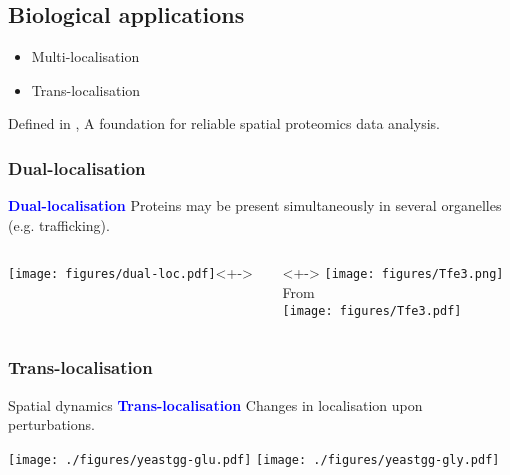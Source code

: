 \subsection{Biological applications}

\begin{frame}
  \begin{itemize}
  \item Multi-localisation
  \item Trans-localisation
  \end{itemize}
  Defined in \cite{Gatto:2014a}, A foundation for reliable spatial proteomics data analysis.
\end{frame}

\subsubsection{Dual-localisation}

\begin{frame}
  \textcolor{Blue}{\textbf{Dual-localisation}} Proteins may be
  present simultaneously in several organelles (e.g. trafficking).      
  \begin{columns}
    \begin{column}{.5\textwidth}
      \texttt{[image: figures/dual-loc.pdf]}<+->
    \end{column}
    \begin{column}{.5\textwidth}<+->
      \centering
      \texttt{[image: figures/Tfe3.png]}\\
      \tiny From \cite{Betschinger:2013} \\
      \texttt{[image: figures/Tfe3.pdf]}
    \end{column}  
  \end{columns}
\end{frame}

\subsubsection{Trans-localisation}

\begin{frame}{Spatial dynamics}
  \textcolor{Blue}{\textbf{Trans-localisation}} Changes in
  localisation upon perturbations. 
  \begin{center}
    \texttt{[image: ./figures/yeastgg-glu.pdf]}
    \texttt{[image: ./figures/yeastgg-gly.pdf]} 
  \end{center}
\end{frame}


